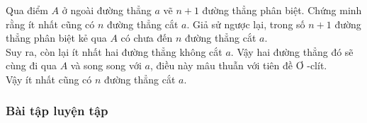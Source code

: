 \begin{vd}%
	Qua điểm $A$ ở ngoài đường thẳng $a$ vẽ $n+1$ đường thẳng phân biệt. Chứng minh rằng ít nhất cũng có $n$ đường thẳng cắt $a$.
	\loigiai
	{
		Giả sử ngược lại, trong số $n+1$ đường thẳng phân biệt kẻ qua $A$ có chưa đến $n$ đường thẳng cắt $a$.\\
		Suy ra, còn lại ít nhất hai đường thẳng không cắt $a$.
		Vậy hai đường thẳng đó sẽ cùng đi qua $A$ và song song với $a$, điều này mâu thuẫn với tiên đề Ơ -clít.\\
		Vậy ít nhất cũng có $n$ đường thẳng cắt $a$. 
	}
\end{vd}
\subsubsection{Bài tập luyện tập}
